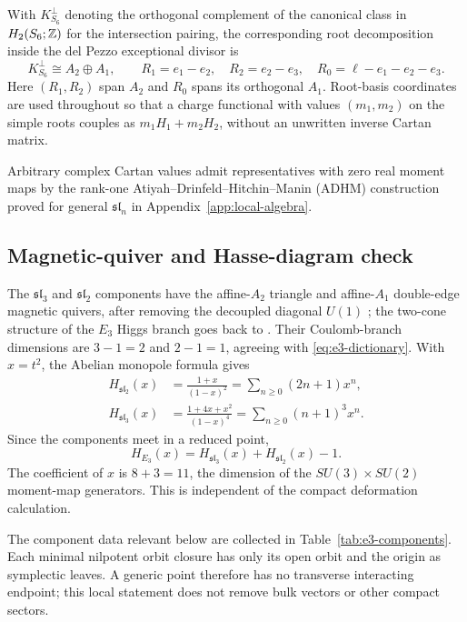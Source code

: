 With $K_{S_6}^{\perp}$ denoting the orthogonal complement of the canonical
class in $H_2(S_6;\mathbb Z)$ for the intersection pairing, the corresponding root
decomposition inside the del Pezzo exceptional divisor is
\begin{equation}
 K_{S_6}^{\perp}\cong A_2\oplus A_1,
 \qquad
 R_1=e_1-e_2,
 \quad R_2=e_2-e_3,
 \quad R_0=\ell-e_1-e_2-e_3.
 \label{eq:e3-roots}
\end{equation}
Here $(R_1,R_2)$ span $A_2$ and $R_0$ spans its orthogonal $A_1$. Root-basis
coordinates are used throughout so that a charge functional with values
$(m_1,m_2)$ on the simple roots couples as $m_1H_1+m_2H_2$, without an
unwritten inverse Cartan matrix.

Arbitrary complex Cartan values admit representatives with zero real
moment maps by the rank-one Atiyah--Drinfeld--Hitchin--Manin (ADHM)
construction proved for general $\mathfrak{sl}_n$ in
Appendix~\ref{app:local-algebra}.

\subsection{Magnetic-quiver and Hasse-diagram check}
\label{subsec:e3-magnetic}

The $\mathfrak{sl}_3$ and $\mathfrak{sl}_2$ components have the affine-$A_2$
triangle and affine-$A_1$ double-edge magnetic quivers, after removing the
decoupled diagonal $U(1)$
\cite{Ferlito:2016,Cabrera:2018,Closset:2020afy}; the two-cone structure of
the $E_3$ Higgs branch goes back to \cite{Seiberg:1996,Morrison:1996pp}.
Their Coulomb-branch dimensions are $3-1=2$ and $2-1=1$, agreeing with
\eqref{eq:e3-dictionary}. With $x=t^2$, the Abelian monopole formula
\cite{Cremonesi:2013} gives
\begin{align}
 H_{\mathfrak{sl}_2}(x)
 &=\frac{1+x}{(1-x)^2}
   =\sum_{n\geq0}(2n+1)x^n,
 \label{eq:e3-hs-a1}\\
 H_{\mathfrak{sl}_3}(x)
 &=\frac{1+4x+x^2}{(1-x)^4}
   =\sum_{n\geq0}(n+1)^3x^n.
 \label{eq:e3-hs-a2}
\end{align}
Since the components meet in a reduced point,
\begin{equation}
 H_{E_3}(x)=H_{\mathfrak{sl}_3}(x)+H_{\mathfrak{sl}_2}(x)-1.
 \label{eq:e3-hs-union}
\end{equation}
The coefficient of $x$ is $8+3=11$, the dimension of the
$SU(3)\times SU(2)$ moment-map generators. This is independent of the compact
deformation calculation.

The component data relevant below are collected in
Table~\ref{tab:e3-components}. Each minimal nilpotent orbit closure has only
its open orbit and the origin as symplectic leaves. A generic point therefore
has no transverse interacting endpoint; this local statement does not remove
bulk vectors or other compact sectors.

